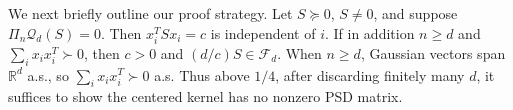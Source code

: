 \documentclass[11pt]{article}
\numberwithin{equation}{section}
\theoremstyle{definition}
\theoremstyle{remark}
\newcommand{\R}{\mathbb R}
\newcommand{\1}{\boldsymbol 1}
\newcommand{\cF}{\mathcal F}
\newcommand{\cQ}{\mathcal Q}
\newcommand{\PiZero}{\Pi_n}
\newcommand{\rank}{\operatorname{rank}}
\newcommand{\res}{\operatorname{res}}
\newcommand{\rentry}[1]{\res_{#1}}
\begin{document}
\begin{humanblock}
We next briefly outline our proof strategy. Let $S\succeq0$, $S\neq0$, and suppose
$\PiZero\cQ_d(S)=0$. Then $x_i^TSx_i=c$ is
independent of $i$. If in addition $n\ge d$ and
$\sum_ix_ix_i^T\succ0$, then $c>0$ and
$(d/c)S\in\cF_d$. When $n\ge d$, Gaussian vectors
span $\R^d$ a.s., so $\sum_ix_ix_i^T\succ0$ a.s.
Thus above $1/4$, after discarding finitely many
$d$, it suffices to show the centered kernel has
no nonzero PSD matrix.




\end{humanblock}
\end{document}
